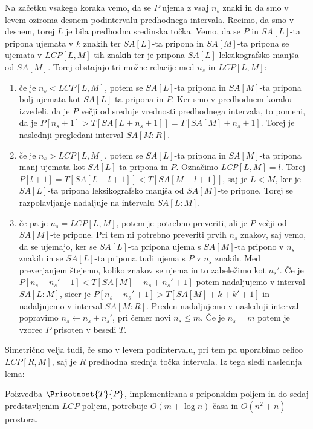 Na začetku vsakega koraka vemo, da se $P$ ujema z vsaj $n_s$ znaki in da smo v levem oziroma desnem podintervalu predhodnega intervala. Recimo, da smo v desnem, torej $L$ je bila predhodna sredinska točka. Vemo, da se $P$ in $SA[L]$-ta pripona ujemata v $k$ znakih ter $SA[L]$-ta pripona in $SA[M]$-ta pripona se ujemata v $LCP[L,M]$-tih znakih ter je pripona $SA[L]$ leksikografsko manjša od $SA[M]$. Torej obstajajo tri možne relacije med $n_s$ in $LCP[L,M]$:
\begin{enumerate}
    \item če je $n_s<LCP[L,M]$, potem se $SA[L]$-ta pripona in $SA[M]$-ta pripona bolj ujemata kot $SA[L]$-ta pripona in $P$. Ker smo v predhodnem koraku izvedeli, da je $P$ večji od srednje vrednosti predhodnega intervala, to pomeni, da je $P[n_s+1]>T[SA[L+n_s+1]]=T[SA[M]+n_s+1]$. Torej je naslednji pregledani interval $SA[M:R]$.
    \item če je $n_s>LCP[L,M]$, potem se $SA[L]$-ta pripona in $SA[M]$-ta pripona manj ujemata kot $SA[L]$-ta pripona in $P$. Označimo \textit{LCP}$[L,M]=l$. Torej $P[l+1]=T[SA[L+l+1]]<T[SA[M+l+1]]$, saj je $L<M$, ker je $SA[L]$-ta pripona leksikografsko manjša od $SA[M]$-te pripone. Torej se razpolavljanje nadaljuje na intervalu $SA[L:M]$.
    \item če pa je $n_s=LCP[L,M]$, potem je potrebno preveriti, ali je $P$ večji od $SA[M]$-te pripone. Pri tem ni potrebno preveriti prvih $n_s$ znakov, saj vemo, da se ujemajo, ker se $SA[L]$-ta pripona ujema s $SA[M]$-ta pripono v $n_s$ znakih in se $SA[L]$-ta pripona tudi ujema s $P$ v $n_s$ znakih. Med preverjanjem štejemo, koliko znakov se ujema in to zabeležimo kot $n_s'$. Če je $P[n_s+n_s'+1]<T[SA[M]+n_s+n_s'+1]$ potem nadaljujemo v interval $SA[L:M]$, sicer je $P[n_s+n_s'+1]>T[SA[M]+k+k'+1]$ in nadaljujemo v interval $SA[M:R]$. Preden nadaljujemo v naslednji interval popravimo $n_s\leftarrow n_s+n_s'$, pri čemer novi $n_s\le m$. Če je $n_s=m$ potem je vzorec $P$ prisoten v besedi $T$.
\end{enumerate}
Simetrično velja tudi, če smo v levem podintervalu, pri tem pa uporabimo celico $LCP[R,M]$, saj je $R$ predhodna srednja točka intervala. Iz tega sledi naslednja lema:


\begin{lema}\label{lema:LCPKvadrat}
    Poizvedba $\Prisotnost{T}{P}$, implementirana s priponskim poljem in do sedaj predstavljenim $LCP$ poljem, potrebuje $O(m+\log{n})$ časa in $O(n^2 +n)$ prostora.
\end{lema}


